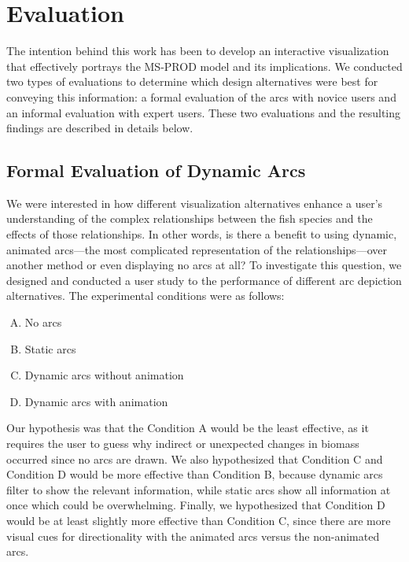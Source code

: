 \chapter{Evaluation}

The intention behind this work has been to develop an interactive visualization that effectively portrays the MS-PROD model and its implications.  We conducted two types of evaluations to determine which design alternatives were best for conveying this information: a formal evaluation of the arcs with novice users and an informal evaluation with expert users.  These two evaluations and the resulting findings are described in details below. 

\section{Formal Evaluation of Dynamic Arcs}

We were interested in how different visualization alternatives enhance a user's understanding of the complex relationships between the fish species and the effects of those relationships.  In other words, is there a benefit to using dynamic, animated arcs---the most complicated representation of the relationships---over another method or even displaying no arcs at all?  To investigate this question, we designed and conducted a user study to the performance of different arc depiction alternatives.  The experimental conditions were as follows:

\begin{enumerate}[(A)]
\item No arcs
\item Static arcs
\item Dynamic arcs without animation
\item Dynamic arcs with animation
\end{enumerate}

Our hypothesis was that the Condition A would be the least effective, as it requires the user to guess why indirect or unexpected changes in biomass occurred since no arcs are drawn.  We also hypothesized that Condition C and Condition D would be more effective than Condition B, because dynamic arcs filter to show the relevant information, while static arcs show all information at once which could be overwhelming.  Finally, we hypothesized that Condition D would be at least slightly more effective than Condition C, since there are more visual cues for directionality with the animated arcs versus the non-animated arcs.

